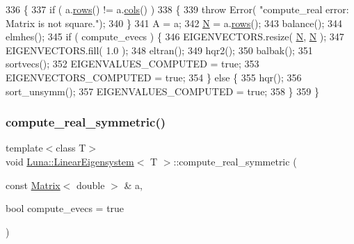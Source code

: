 \begin{DoxyCode}
336   \{
337     \textcolor{keywordflow}{if} ( a.\hyperlink{classLuna_1_1Matrix_ae7b0b30c3e22ba252d660f093757295e}{rows}() != a.\hyperlink{classLuna_1_1Matrix_aa7472f90f4c470535e722f3a389a19b1}{cols}() )
338     \{
339       \textcolor{keywordflow}{throw} Error( \textcolor{stringliteral}{"compute\_real error: Matrix is not square."});
340     \}
341     A = a;
342     \hyperlink{namespaceHeat__plot_a7d050092798e28458a263710837bda77}{N} = a.\hyperlink{classLuna_1_1Matrix_ae7b0b30c3e22ba252d660f093757295e}{rows}();
343     balance();
344     elmhes();
345     \textcolor{keywordflow}{if} ( compute\_evecs ) \{
346       EIGENVECTORS.resize( \hyperlink{namespaceHeat__plot_a7d050092798e28458a263710837bda77}{N}, \hyperlink{namespaceHeat__plot_a7d050092798e28458a263710837bda77}{N} );
347       EIGENVECTORS.fill( 1.0 );
348       eltran();
349       hqr2();
350       balbak();
351       sortvecs();
352       EIGENVALUES\_COMPUTED = \textcolor{keyword}{true};
353       EIGENVECTORS\_COMPUTED = \textcolor{keyword}{true};
354     \} \textcolor{keywordflow}{else} \{
355       hqr();
356       sort\_unsymm();
357       EIGENVALUES\_COMPUTED = \textcolor{keyword}{true};
358     \}
359   \}
\end{DoxyCode}
\mbox{\label{classLuna_1_1LinearEigensystem_ae109e1012fda347ac9c1da4fa30313f6}} 
\subsubsection{\texorpdfstring{compute\+\_\+real\+\_\+symmetric()}{compute\_real\_symmetric()}\hspace{0.1cm}{\footnotesize\ttfamily [1/2]}}
{\footnotesize\ttfamily template$<$class T$>$ \\
void \hyperlink{classLuna_1_1LinearEigensystem}{Luna\+::\+Linear\+Eigensystem}$<$ T $>$\+::compute\+\_\+real\+\_\+symmetric (\begin{DoxyParamCaption}\item[{const \hyperlink{classLuna_1_1Matrix}{Matrix}$<$ double $>$ \&}]{a,  }\item[{bool}]{compute\+\_\+evecs = {\ttfamily true} }\end{DoxyParamCaption})}



